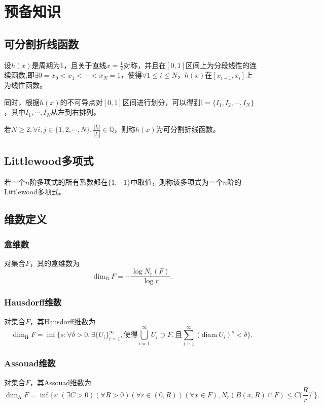 \section{预备知识}
\subsection{可分割折线函数}

设$h(x)$是周期为1，且关于直线$x=\frac{1}{2}$对称，并且在$[0,1]$区间上为分段线性的连续函数,即$\exists0=x_0<x_1<\cdots<x_N=1$，使得$\forall 1\le i\le N$，$h(x)$在$[x_{i-1},x_i]$上为线性函数。

同时，根据$h(x)$的不可导点对$[0,1]$区间进行划分，可以得到$\mathbb{I}=\{I_1,I_2,\cdots,I_N\}$，其中$I_1,\cdots,I_N$从左到右排列。

若$N\ge2,\forall i,j\in\{1,2,\cdots,N\},\frac{|I_i|}{|I_j|}\in\mathbb{Q}$，则称$h(x)$为可分割折线函数。

\subsection{Littlewood多项式}
若一个$n$阶多项式的所有系数都在$\{1,-1\}$中取值，则称该多项式为一个$n$阶的Littlewood多项式。

\subsection{维数定义}
\subsubsection{盒维数}
对集合$F$，其的盒维数为
$$
      \mathrm{\dim_B}F=-\frac{\log N_r(F)}{\log r}.
$$

\subsubsection{Hausdorff维数}
对集合$F$，其Hausdorff维数为
$$
      \mathrm{\dim_H}F=\inf\{s:\forall\delta>0,\exists\{U_i\}_{i=1}^\infty,\mbox{使得}\bigcup_{i=1}^\infty U_i\supset F,\mbox{且}\sum_{i=1}^\infty (\mathrm{diam}~U_i)^s<\delta\}.
$$

\subsubsection{Assouad维数}
对集合$F$，其Assouad维数为
$$
      \mathrm{\dim_A}F=\inf\{s:(\exists C>0)(\forall R>0)(\forall r\in(0,R))(\forall x\in F),N_r(B(x,R)\cap F)\le C\Big(\frac{R}{r}\Big)^s\}.
$$


